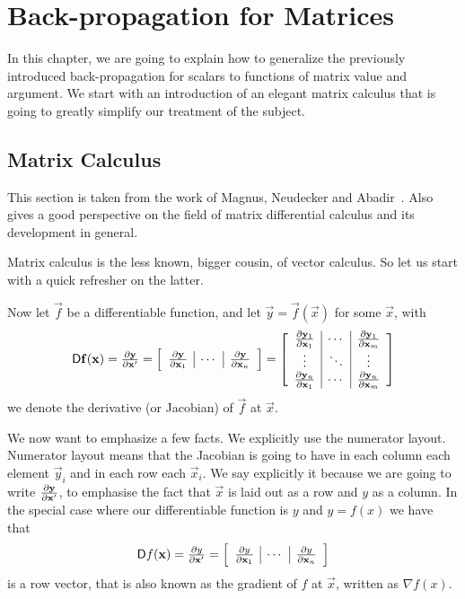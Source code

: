 \documentclass{sapthesis}
\begin{document}
\chapter{Back-propagation for Matrices}

In this chapter, we are going to explain how to generalize the previously
introduced back-propagation for scalars to functions of matrix value and
argument. We start with an introduction of an elegant matrix calculus that is
going to greatly simplify our treatment of the subject.

\section{Matrix Calculus}\label{sec:matcalc}

This section is taken from the work of Magnus, Neudecker and Abadir~\cite{neudecker1969,
magnus1985, magnus2005, magnus2007, magnus2010, magnus2019}. 
Also~\cite{liu2022} gives a good perspective on the field of matrix
differential calculus and its development in general.

Matrix calculus is the less known, bigger cousin, of vector calculus. So let us
start with a quick refresher on the latter.

Now let \(\vec f\) be a differentiable function, and let \(\vec y = \vec f(\vec
x)\) for some \(\vec x\), with \[
    \mathop{}\!\mathsf D\mathbf{f}(\mathbf{x})
    = \textstyle\frac{\partial\mathbf{y}}{\partial\mathbf{x}'}
    = \left[\begin{array}{c|c|c}
        \textstyle\frac{\partial\mathbf{y}}{\partial\mathbf{x}_1} & \cdots & \textstyle\frac{\partial\mathbf{y}}{\partial\mathbf{x}_n}
    \end{array}\right]
    = \left[\begin{array}{c|c|c}
        \textstyle\frac{\partial\mathbf{y}_1}{\partial\mathbf{x}_1} & \cdots & \textstyle\frac{\partial\mathbf{y}_1}{\partial\mathbf{x}_m} \\
        \vdots & \ddots & \vdots \\
        \textstyle\frac{\partial\mathbf{y}_n}{\partial\mathbf{x}_1} & \cdots & \textstyle\frac{\partial\mathbf{y}_n}{\partial\mathbf{x}_m}
    \end{array}\right]
\] we denote the derivative (or Jacobian) of \(\vec f\) at \(\vec x\).

We now want to emphasize a few facts. We explicitly use the numerator layout.
Numerator layout means that the Jacobian is going to have in each column each
element \(\vec y_i\) and in each row each \(\vec x_i\). We say explicitly it
because we are going to write \(\textstyle\frac{\partial\mathbf{y}}{\partial\mathbf{x}'}\), to emphasise
the fact that \(\vec x\) is laid out as a row and \(y\) as a column. In the
special case where our differentiable function is \(y\) and \(y = f(x)\) we have
that \[
    \mathop{}\!\mathsf D f(\mathbf{x}) = \textstyle\frac{\partial y}{\partial\mathbf{x}'} = \left[\begin{array}{c|c|c}
        \textstyle\frac{\partial y}{\partial\mathbf{x}_1} & \cdots & \textstyle\frac{\partial y}{\partial\mathbf{x}_n}
    \end{array}\right]
\] is a row vector, that is also known as the gradient of \(f\) at \(\vec x\),
written as \(\nabla f(x).\)
\end{document}
